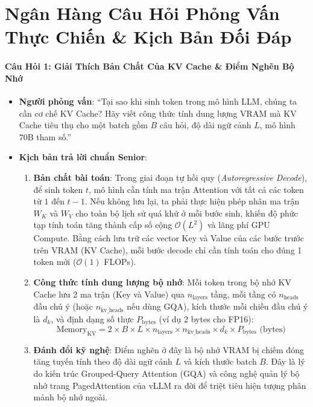 \section{Ngân Hàng Câu Hỏi Phỏng Vấn Thực Chiến \& Kịch Bản Đối Đáp}
\label{sec:ch15-questions-bank}

\paragraph{Câu Hỏi 1: Giải Thích Bản Chất Của KV Cache \& Điểm Nghẽn Bộ Nhớ}
\begin{itemize}
  \item \textbf{Người phỏng vấn}: ``Tại sao khi sinh token trong mô hình LLM, chúng ta cần cơ chế KV Cache? Hãy viết công thức tính dung lượng VRAM mà KV Cache tiêu thụ cho một batch gồm $B$ câu hỏi, độ dài ngữ cảnh $L$, mô hình 70B tham số.''
  \item \textbf{Kịch bản trả lời chuẩn Senior}:
  \begin{enumerate}
    \item \textbf{Bản chất bài toán}: Trong giai đoạn tự hồi quy (\textit{Autoregressive Decode}), để sinh token $t$, mô hình cần tính ma trận Attention với tất cả các token từ $1$ đến $t-1$. Nếu không lưu lại, ta phải thực hiện phép nhân ma trận $W_K$ và $W_V$ cho toàn bộ lịch sử quá khứ ở mỗi bước sinh, khiến độ phức tạp tính toán tăng thành cấp số cộng $\mathcal{O}(L^2)$ và lãng phí GPU Compute. Bằng cách lưu trữ các vector Key và Value của các bước trước trên VRAM (KV Cache), mỗi bước decode chỉ cần tính toán cho đúng 1 token mới ($\mathcal{O}(1)$ FLOPs).
    \item \textbf{Công thức tính dung lượng bộ nhớ}:
    Mỗi token trong bộ nhớ KV Cache lưu 2 ma trận (Key và Value) qua $n_{\text{layers}}$ tầng, mỗi tầng có $n_{\text{heads}}$ đầu chú ý (hoặc $n_{\text{kv\_heads}}$ nếu dùng GQA), kích thước mỗi chiều đầu chú ý là $d_k$, và định dạng số thực $P_{\text{bytes}}$ (ví dụ 2 bytes cho FP16):
    \begin{equation}
    \text{Memory}_{\text{KV}} = 2 \times B \times L \times n_{\text{layers}} \times n_{\text{kv\_heads}} \times d_k \times P_{\text{bytes}} \text{ (bytes)}
    \end{equation}
    \item \textbf{Đánh đổi kỹ nghệ}: Điểm nghẽn ở đây là bộ nhớ VRAM bị chiếm đóng tăng tuyến tính theo độ dài ngữ cảnh $L$ và kích thước batch $B$. Đây là lý do kiến trúc Grouped-Query Attention (GQA) và công nghệ quản lý bộ nhớ trang PagedAttention của vLLM ra đời để triệt tiêu hiện tượng phân mảnh bộ nhớ ngoài.
  \end{enumerate}
\end{itemize}

